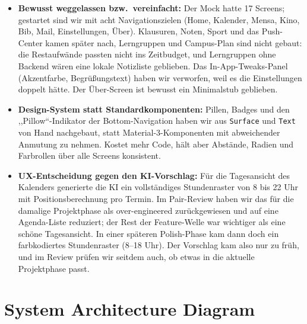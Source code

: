 \documentclass{msereport}
\begin{document}
\begin{itemize}
  \item \textbf{Bewusst weggelassen bzw.\ vereinfacht:} Der Mock hatte 17
        Screens; gestartet sind wir mit acht Navigationszielen (Home, Kalender,
        Mensa, Kino, Bib, Mail, Einstellungen, Über). Klausuren, Noten, Sport und
        das Push-Center kamen später nach, Lerngruppen und Campus-Plan sind nicht
        gebaut: die Restaufwände passten nicht ins Zeitbudget, und Lerngruppen
        ohne Backend wären eine lokale Notizliste geblieben. Das
        In-App-Tweaks-Panel (Akzentfarbe, Begrüßungstext) haben wir verworfen,
        weil es die Einstellungen doppelt hätte. Der Über-Screen ist bewusst ein
        Minimalstub geblieben.
  \item \textbf{Design-System statt Standardkomponenten:} Pillen, Badges und den
        ,,Pillow``-Indikator der Bottom-Navigation haben wir aus
        \texttt{Surface} und \texttt{Text} von Hand nachgebaut, statt
        Material-3-Komponenten mit abweichender Anmutung zu nehmen. Kostet mehr
        Code, hält aber Abstände, Radien und Farbrollen über alle Screens
        konsistent.
  \item \textbf{UX-Entscheidung gegen den KI-Vorschlag:} Für die Tagesansicht des
        Kalenders generierte die KI ein vollständiges Stundenraster von 8 bis 22
        Uhr mit Positionsberechnung pro Termin. Im Pair-Review haben wir das für
        die damalige Projektphase als over-engineered zurückgewiesen und auf eine
        Agenda-Liste reduziert; der Rest der Feature-Welle war wichtiger als eine
        schöne Tagesansicht. In einer späteren Polish-Phase kam dann doch ein
        farbkodiertes Stundenraster (8--18 Uhr). Der Vorschlag kam also nur zu
        früh, und im Review prüfen wir seitdem auch, ob etwas in die aktuelle
        Projektphase passt.
\end{itemize}

\msegap

\section{System Architecture Diagram}
\end{document}

